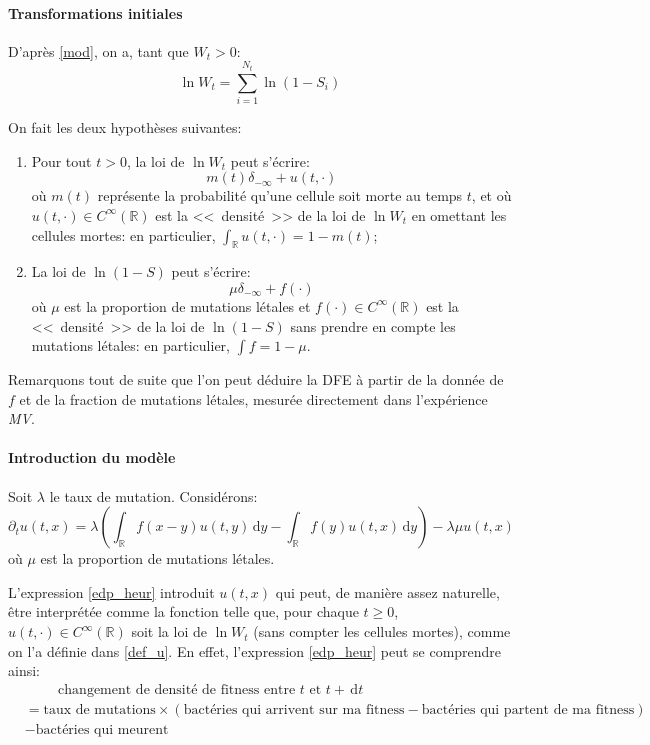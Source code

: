 \documentclass[12pt]{article}
\newcounter{prop}[section]
\newcommand{\pth}[1]{\left(#1\right)}
\newcommand{\esp}{\hspace{1cm}}
\newcommand{\Er}{\mathbb{R}}
\newcommand{\de}{\,\mathrm{d}}
\newcommand{\dr}{\partial}
\begin{document}
\paragraph{Transformations initiales}

D'après \eqref{mod}, on a, tant que $W_t>0$: \[\ln W_t=\sum_{i=1}^{N_t}\ln(1-S_i)\]

On fait les deux hypothèses suivantes:
\begin{enumerate}
\item Pour tout $t>0$, la loi de $\ln W_t$ peut s'écrire:
  \begin{equation}\label{def_u} m(t)\delta_{-\infty}+u(t,\cdot)\end{equation}
  où $m(t)$ représente la probabilité qu'une cellule soit morte au temps $t$, et où $u(t,\cdot)\in C^{\infty}(\Er)$ est la <<~densité~>> de la loi de $\ln W_t$ en omettant les cellules mortes: en particulier, $\int_{\Er}u(t,\cdot)=1-m(t)$;
\item La loi de $\ln (1-S)$ peut s'écrire:
  \[\mu\delta_{-\infty}+f(\cdot)\]
  où $\mu$ est la proportion de mutations létales et $f(\cdot)\in C^{\infty}(\Er)$ est la <<~densité~>> de la loi de $\ln(1-S)$ sans prendre en compte les mutations létales: en particulier, $\int f=1-\mu$.
\end{enumerate}

Remarquons tout de suite que l'on peut déduire la DFE à partir de la donnée de $f$ et de la fraction de mutations létales, mesurée directement dans l'expérience \emph{MV}.

\paragraph{Introduction du modèle}

Soit $\lambda$ le taux de mutation. Considérons:
\begin{equation}\label{edp_heur} \dr_tu(t,x)=\lambda\pth{\int_{\Er}f(x-y)u(t,y)\de y-\int_{\Er}f(y)u(t,x)\de y}-\lambda\mu u(t,x)\end{equation}
où $\mu$ est la proportion de mutations létales.

L'expression \eqref{edp_heur} introduit $u(t,x)$ qui peut, de manière assez naturelle, être interprétée comme la fonction telle que, pour chaque $t\geqslant 0$, $u(t,\cdot)\in C^{\infty}(\Er)$ soit la loi de $\ln W_t$ (sans compter les cellules mortes), comme on l'a définie dans \eqref{def_u}. En effet, l'expression \eqref{edp_heur} peut se comprendre ainsi:
\begin{align*}
&\esp\text{changement de densité de fitness entre $t$ et $t+\de t$}\\
&=\text{taux de mutations}\times\pth{\text{bactéries qui arrivent sur ma fitness}-\text{bactéries qui partent de ma fitness}}\\
&-\text{bactéries qui meurent}
\end{align*} 
\end{document}
